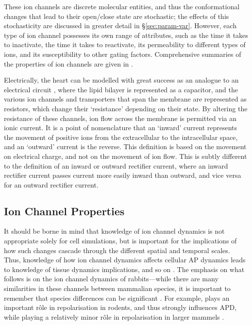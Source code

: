 \documentclass[../thesis-main.tex]{subfiles}
\begin{document}
These ion channels are discrete molecular entities, and thus the conformational changes that lead to their open/close state are stochastic; the effects of this stochasticity are discussed in greater detail in \S\ref{sec:param-var}. However, each type of ion channel possesses its own range of attributes, such as the time it takes to inactivate, the time it takes to reactivate, its permeability to different types of ions, and its susceptibility to other gating factors. Comprehensive summaries of the properties of ion channels are given in \citet{Carmeliet2002, Roden2002}.

Electrically, the heart can be modelled with great success as an analogue to an electrical circuit \citep{Carmeliet2002}, where the lipid bilayer is represented as a capacitor, and the various ion channels and transporters that span the membrane are represented as resistors, which change their `resistance' depending on their state. By altering the resistance of these channels, ion flow across the membrane is permitted via an ionic current. It is a point of nomenclature that an `inward' current represents the movement of positive ions from the extracellular to the intracellular space, and an `outward' current is the reverse. This definition is based on the movement on electrical charge, and not on the movement of ion flow. This is subtly different to the definition of an inward or outward rectifier current, where an inward rectifier current passes current more easily inward than outward, and vice versa for an outward rectifier current.

\subsection{Ion Channel Properties}
\label{subsec:ion-channel}
It should be borne in mind that knowledge of ion channel dynamics is not appropriate solely for cell simulations, but is important for the implications of how such changes cascade through the different spatial and temporal scales. Thus, knowledge of how ion channel dynamics affects cellular AP dynamics leads to knowledge of tissue dynamics implications, and so on \citep{Spach1988}. The emphasis on what follows is on the ion channel dynamics of rabbits---while there are many similarities in these channels between mammalian species, it is important to remember that species differences can be significant \citep{Bassani1994}. For example, \ito{} plays an important r\^ole in repolarisation in rodents, and thus strongly influences APD, while playing a relatively minor r\^ole in repolarisation in larger mammels \citep{Rosati2004}.
\end{document}
